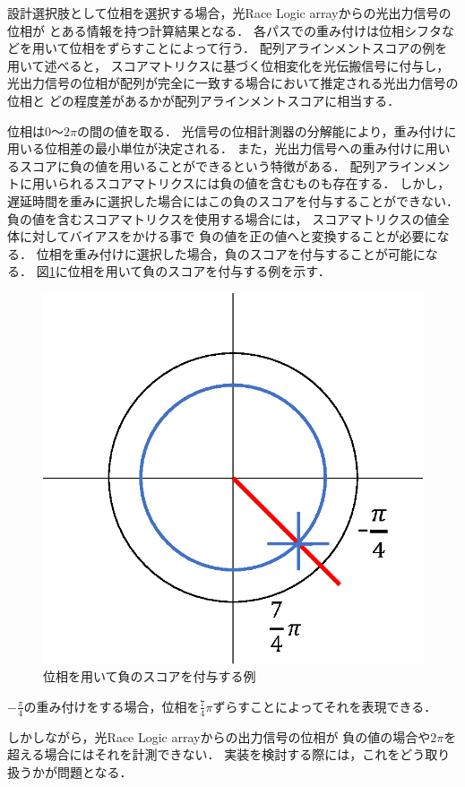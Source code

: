 設計選択肢として位相を選択する場合，光Race Logic arrayからの光出力信号の位相が
とある情報を持つ計算結果となる．
各パスでの重み付けは位相シフタなどを用いて位相をずらすことによって行う．
配列アラインメントスコアの例を用いて述べると，
スコアマトリクスに基づく位相変化を光伝搬信号に付与し，
光出力信号の位相が配列が完全に一致する場合において推定される光出力信号の位相と
どの程度差があるかが配列アラインメントスコアに相当する．

位相は$0〜2\pi$の間の値を取る．
光信号の位相計測器の分解能により，重み付けに用いる位相差の最小単位が決定される．
また，光出力信号への重み付けに用いるスコアに負の値を用いることができるという特徴がある．
配列アラインメントに用いられるスコアマトリクスには負の値を含むものも存在する．
しかし，遅延時間を重みに選択した場合にはこの負のスコアを付与することができない．
負の値を含むスコアマトリクスを使用する場合には，
スコアマトリクスの値全体に対してバイアスをかける事で
負の値を正の値へと変換することが必要になる．
位相を重み付けに選択した場合，負のスコアを付与することが可能になる．
図\ref{fig:isou}に位相を用いて負のスコアを付与する例を示す．
\begin{figure}[t!]
\begin{center}
\includegraphics[keepaspectratio,scale=0.5]{fig/5/isou.eps}
\caption{位相を用いて負のスコアを付与する例}
\label{fig:isou}
\end{center}
\end{figure}
$-\frac{\pi}{4}$の重み付けをする場合，位相を$\frac{7}{4}\pi$ずらすことによってそれを表現できる．

しかしながら，光Race Logic arrayからの出力信号の位相が
負の値の場合や$2\pi$を超える場合にはそれを計測できない．
実装を検討する際には，これをどう取り扱うかが問題となる．
